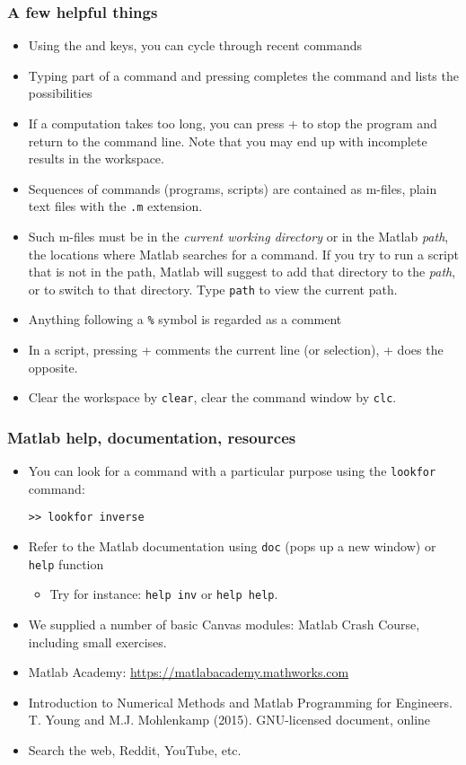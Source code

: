  \begin{frame}[fragile]
  \frametitle{A few helpful things}
  \begin{itemize}[<+->]
    \item Using the \keystroke{$\uparrow$} and \keystroke{$\downarrow$} keys, you can cycle through recent commands
    \item Typing part of a command and pressing  completes the command and lists the possibilities
    \item If a computation takes too long, you can press + to stop the program and return to the command line. Note that you may end up with incomplete results in the workspace.
    \item Sequences of commands (programs, scripts) are contained as m-files, plain text files with the \lstinline$.m$ extension.
    \item Such m-files must be in the \emph{current working directory} or in the Matlab \emph{path}, the locations where Matlab searches for a command. If you try to run a script that is not in the path, Matlab will suggest to add that directory to the \emph{path}, or to switch to that directory. Type \lstinline$path$ to view the current path.
    \item Anything following a \lstinline$%$ symbol is regarded as a comment
    \item In a script, pressing + comments the current line (or selection), + does the opposite.
    \item Clear the workspace by \lstinline$clear$, clear the command window by \lstinline$clc$.
  \end{itemize}
\end{frame}

\begin{frame}[fragile]
\frametitle{Matlab help, documentation, resources}
\begin{itemize}[<+->]
  \item You can look for a command with a particular purpose using the \lstinline$lookfor$ command:
  \begin{lstlisting}
>> lookfor inverse
  \end{lstlisting}
  \item Refer to the Matlab documentation using \lstinline$doc$ (pops up a new window) or \lstinline$help$ function
  \begin{itemize}
    \item Try for instance: \lstinline$help inv$ or \lstinline$help help$.
  \end{itemize}
  \item We supplied a number of basic Canvas modules: Matlab Crash Course, including small exercises.
  \item Matlab Academy: \url{https://matlabacademy.mathworks.com}
  \item Introduction to Numerical Methods and Matlab Programming for Engineers. T. Young and M.J. Mohlenkamp (2015). GNU-licensed document, online
  \item Search the web, Reddit, YouTube, etc.
\end{itemize}
\end{frame}

